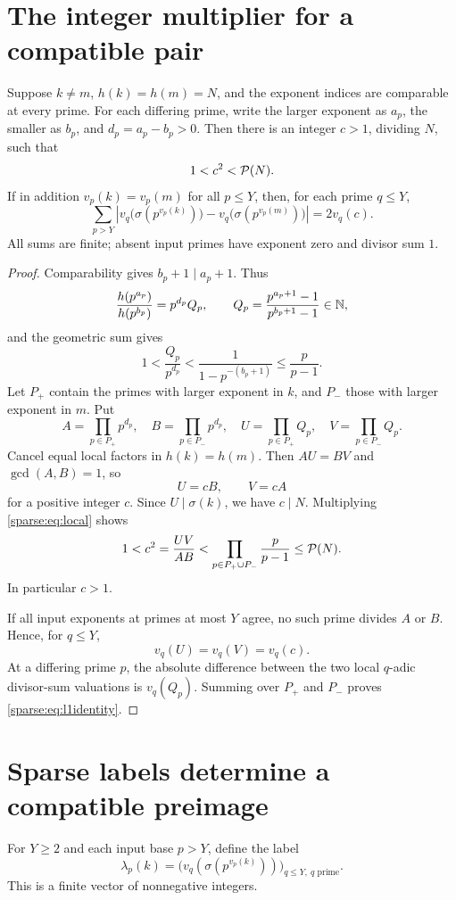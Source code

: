 \section{The integer multiplier for a compatible pair}
\begin{lemma}\label{sparse:lem:multiplier}
Suppose $k\ne m$, $h(k)=h(m)=N$, and the exponent indices are comparable at every prime. For each differing prime, write the larger exponent as $a_p$, the smaller as $b_p$, and $d_p=a_p-b_p>0$. Then there is an integer $c>1$, dividing $N$, such that
\[
 1<c^2<\mathcal P(N).
\]
If in addition $v_p(k)=v_p(m)$ for all $p\le Y$, then, for each prime $q\le Y$,
\begin{equation}\label{sparse:eq:l1identity}
 \sum_{p>Y}\left|v_q\bigl(\sigma(p^{v_p(k)})\bigr)
                   -v_q\bigl(\sigma(p^{v_p(m)})\bigr)\right|
 =2v_q(c).
\end{equation}
All sums are finite; absent input primes have exponent zero and divisor sum $1$.
\end{lemma}
\begin{proof}
Comparability gives $b_p+1\mid a_p+1$. Thus
\[
 \frac{h(p^{a_p})}{h(p^{b_p})}=p^{d_p}Q_p,
 \qquad Q_p=\frac{p^{a_p+1}-1}{p^{b_p+1}-1}\in\mathbb N,
\]
and the geometric sum gives
\begin{equation}\label{sparse:eq:local}
 1<\frac{Q_p}{p^{d_p}}<\frac1{1-p^{-(b_p+1)}}\le\frac p{p-1}.
\end{equation}
Let $P_+$ contain the primes with larger exponent in $k$, and $P_-$ those with larger exponent in $m$. Put
\[
 A=\prod_{p\in P_+}p^{d_p},\quad B=\prod_{p\in P_-}p^{d_p},\quad
 U=\prod_{p\in P_+}Q_p,\quad V=\prod_{p\in P_-}Q_p.
\]
Cancel equal local factors in $h(k)=h(m)$. Then $AU=BV$ and $\gcd(A,B)=1$, so
\[
 U=cB,\qquad V=cA
\]
for a positive integer $c$. Since $U\mid\sigma(k)$, we have $c\mid N$. Multiplying \eqref{sparse:eq:local} shows
\[
 1<c^2=\frac{UV}{AB}
 <\prod_{p\in P_+\cup P_-}\frac p{p-1}\le\mathcal P(N).
\]
In particular $c>1$.

If all input exponents at primes at most $Y$ agree, no such prime divides $A$ or $B$. Hence, for $q\le Y$,
\[
 v_q(U)=v_q(V)=v_q(c).
\]
At a differing prime $p$, the absolute difference between the two local $q$-adic divisor-sum valuations is $v_q(Q_p)$. Summing over $P_+$ and $P_-$ proves \eqref{sparse:eq:l1identity}.
\end{proof}


\section{Sparse labels determine a compatible preimage}
For $Y\ge2$ and each input base $p>Y$, define the label
\[
 \lambda_p(k)=\bigl(v_q(\sigma(p^{v_p(k)}))\bigr)_{q\le Y,\ q\text{ prime}}.
\]
This is a finite vector of nonnegative integers.


